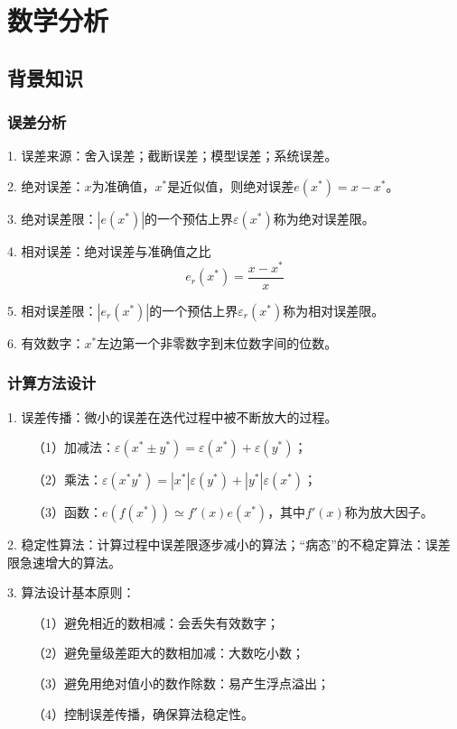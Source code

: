 \chapter{数学分析}
\thispagestyle{empty}

\setlength{\fboxrule}{0pt}\setlength{\fboxsep}{0cm}
\noindent{}
\setlength{\fboxrule}{1pt}\setlength{\fboxsep}{4pt}


\newpage

\section{背景知识}

\subsection{误差分析}

1. 误差来源：舍入误差；截断误差；模型误差；系统误差。

2. 绝对误差：$x$为准确值，$x^*$是近似值，则绝对误差$e(x^*)=x-x^*$。

3. 绝对误差限：$|e(x^*)|$的一个预估上界$\varepsilon(x^*)$称为绝对误差限。

4. 相对误差：绝对误差与准确值之比
\begin{equation*}
    e_r(x^*)=\frac{x-x^*}{x}
\end{equation*}

5. 相对误差限：$|e_r(x^*)|$的一个预估上界$\varepsilon_r(x^*)$称为相对误差限。

6. 有效数字：$x^*$左边第一个非零数字到末位数字间的位数。

\subsection{计算方法设计}

1. 误差传播：微小的误差在迭代过程中被不断放大的过程。

~~~~（1）加减法：$\varepsilon(x^*\pm y^*)=\varepsilon(x^*)+\varepsilon(y^*)$；

~~~~（2）乘法：$\varepsilon(x^*y^*)=|x^*|\varepsilon(y^*)+|y^*|\varepsilon(x^*)$；

~~~~（3）函数：$e\left(f(x^*)\right)\simeq f'(x)e(x^*)$，其中$f'(x)$称为放大因子。

2. 稳定性算法：计算过程中误差限逐步减小的算法；“病态”的不稳定算法：误差限急速增大的算法。

3. 算法设计基本原则：

~~~~（1）避免相近的数相减：会丢失有效数字；

~~~~（2）避免量级差距大的数相加减：大数吃小数；

~~~~（3）避免用绝对值小的数作除数：易产生浮点溢出；

~~~~（4）控制误差传播，确保算法稳定性。